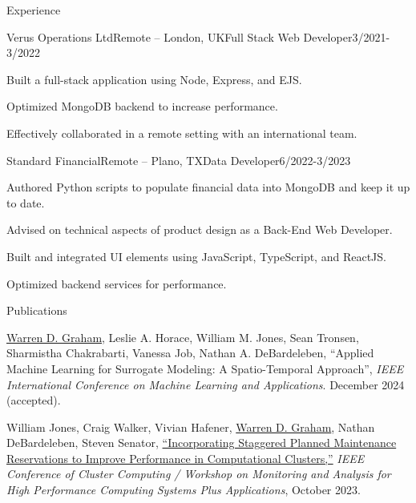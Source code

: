 \documentclass{resume} %
\begin{document}
\begin{rSection}{Experience}
\begin{rSubsection}{Verus Operations Ltd}{Remote – London, UK}{Full Stack Web Developer}{3/2021-3/2022}
  \item Built a full-stack application using Node, Express, and EJS.
  \item Optimized MongoDB backend to increase performance.
  \item Effectively collaborated in a remote setting with an international team.
\end{rSubsection}

\begin{rSubsection}{Standard Financial}{Remote – Plano, TX}{Data Developer}{6/2022-3/2023}
  \item Authored Python scripts to populate financial data into MongoDB and keep it up to date. 
  \item Advised on technical aspects of product design as a Back-End Web Developer.
  \item Built and integrated UI elements using JavaScript, TypeScript, and ReactJS.
  \item Optimized backend services for performance.
\end{rSubsection}

\end{rSection} 

\begin{rSection}{Publications} 
  \itemsep -1pt
  \renewcommand{\labelenumi}{[\theenumi]}
  \begin{etaremune}
    \item \underline{Warren D. Graham}, Leslie A. Horace, William M. Jones, Sean Tronsen, Sharmistha Chakrabarti, Vanessa Job, Nathan A. DeBardeleben, “Applied Machine Learning for Surrogate Modeling: A Spatio-Temporal Approach”, \textit{IEEE International Conference on Machine Learning and Applications}. December 2024 (accepted).
    \item William Jones, Craig Walker, Vivian Hafener, \underline{Warren D. Graham}, Nathan DeBardeleben, Steven Senator, \href{https://doi.ieeecomputersociety.org/10.1109/CLUSTERWorkshops61457.2023.00015}{“Incorporating Staggered Planned Maintenance Reservations to Improve Performance in Computational Clusters,”} \textit{IEEE Conference of Cluster Computing / Workshop on Monitoring and Analysis for High Performance Computing Systems Plus Applications}, October 2023.
  \end{etaremune}
\end{rSection}
\end{document}
